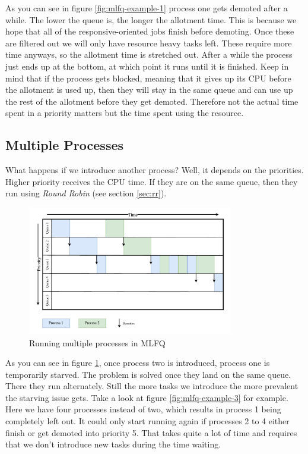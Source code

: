 As you can see in figure \ref{fig:mlfq-example-1} process one gets demoted after a while.
The lower the queue is, the longer the allotment time. 
This is because we hope that all of the responsive-oriented jobs finish before demoting.
Once these are filtered out we will only have resource heavy tasks left.
These require more time anyways, so the allotment time is stretched out.
After a while the process just ends up at the bottom, at which point it runs until it is finished.
Keep in mind that if the process gets blocked, meaning that it gives up its CPU before the allotment is used up, then they will stay in the same queue and can use up the rest of the allotment before they get demoted. Therefore not the actual time spent in a priority matters but the time spent using the resource.

\subsection{Multiple Processes}

What happens if we introduce another process?
Well, it depends on the priorities. 
Higher priority receives the CPU time.
If they are on the same queue, then they run using \emph{Round Robin} (see section \ref{sec:rr}).


\begin{figure}[h]
    \centering
    \includegraphics[width=0.8\textwidth]{Assets/MLFQ-Example-2.pdf}
    \caption{Running multiple processes in MLFQ}
    \label{fig:mlfq-example-2}
\end{figure}

As you can see in figure \ref{fig:mlfq-example-2}, once process two is introduced, process one is temporarily starved. The problem is solved once they land on the same queue.
There they run alternately.
Still the more tasks we introduce the more prevalent the starving issue gets.
Take a look at figure \ref{fig:mlfq-example-3} for example. 
Here we have four processes instead of two, which results in process 1 being completely left out.
It could only start running again if processes 2 to 4 either finish or get demoted into priority 5.
That takes quite a lot of time and requires that we don't introduce new tasks during the time waiting.


